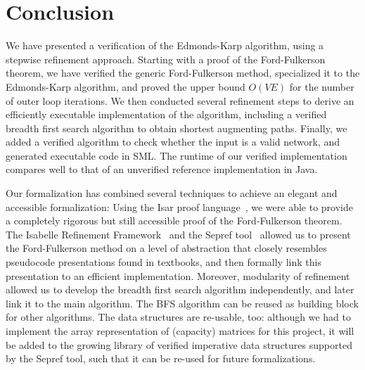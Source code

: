 \documentclass[smallcondensed]{svjour3}     %
\begin{document}
    

\section{Conclusion}\label{sec:concl}
  We have presented a verification of the Edmonds-Karp algorithm, using a stepwise refinement approach.
  Starting with a proof of the Ford-Fulkerson theorem, we have verified the generic Ford-Fulkerson method, 
  specialized it to the Edmonds-Karp algorithm, and proved the upper bound $O(VE)$ for the number of outer loop iterations.
  We then conducted several refinement steps to derive an efficiently executable implementation of the algorithm, 
  including a verified breadth first search algorithm to obtain shortest augmenting paths. 
  Finally, we added a verified algorithm to check whether the input is a valid network, and generated executable code in SML.
  The runtime of our verified implementation compares well to that of an unverified reference implementation in Java.
  
  Our formalization has combined several techniques to achieve an elegant and accessible formalization: 
  Using the Isar proof language~\cite{Wenzel99}, we were able to provide a completely rigorous but 
  still accessible proof of the Ford-Fulkerson theorem. The Isabelle Refinement Framework~\cite{LaTu12,La12} and the Sepref tool~\cite{La15,La16}
  allowed us to present the Ford-Fulkerson method on a level 
  of abstraction that closely resembles pseudocode presentations found in textbooks, and then formally link this presentation to an efficient
  implementation. Moreover, modularity of refinement allowed us to develop the breadth first search algorithm independently, and later link it to the 
  main algorithm. The BFS algorithm can be reused as building block for other algorithms. The data structures are re-usable, too: although we had to implement the array representation of (capacity) matrices for this project, it will be added to the growing library of verified imperative data structures 
  supported by the Sepref tool, such that it can be re-used for future formalizations.
  
\end{document}
